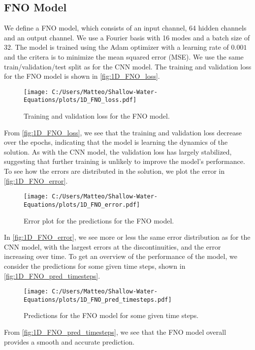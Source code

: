 \subsection*{FNO Model}
We define a FNO model, which consists of an input channel, 64 hidden channels and an output channel. We use a Fourier basis with 16 modes and a batch size of 32.
The model is trained using the Adam optimizer with a learning rate of $0.001$ and the critera is to minimize the mean squared error (MSE).
We use the same train/validation/test split as for the CNN model.
The training and validation loss for the FNO model is shown in \autoref{fig:1D_FNO_loss}.
\begin{figure}[H]
    \centering
    \texttt{[image: C:/Users/Matteo/Shallow-Water-Equations/plots/1D\_FNO\_loss.pdf]}
    \caption{Training and validation loss for the FNO model.}\label{fig:1D_FNO_loss}
\end{figure}
From \autoref{fig:1D_FNO_loss}, we see that the training and validation loss decrease over the epochs, indicating that the model is learning the dynamics of the solution.
As with the CNN model, the validation loss has largely stabilized, suggesting that further training is unlikely to improve the model's performance.
To see how the errors are distributed in the solution, we plot the error in \autoref{fig:1D_FNO_error}.
\begin{figure}[H]
    \centering
    \texttt{[image: C:/Users/Matteo/Shallow-Water-Equations/plots/1D\_FNO\_error.pdf]}
    \caption{Error plot for the predictions for the FNO model.}\label{fig:1D_FNO_error}
\end{figure}
In \autoref{fig:1D_FNO_error}, we see more or less the same error distribution as for the CNN model, with the largest errors at the discontinuities, and the error increasing over time.
To get an overview of the performance of the model, we consider the predictions for some given time steps, shown in \autoref{fig:1D_FNO_pred_timesteps}.
\begin{figure}[H]
    \centering
    \texttt{[image: C:/Users/Matteo/Shallow-Water-Equations/plots/1D\_FNO\_pred\_timesteps.pdf]}
    \caption{Predictions for the FNO model for some given time steps.}\label{fig:1D_FNO_pred_timesteps}
\end{figure}
From \autoref{fig:1D_FNO_pred_timesteps}, we see that the FNO model overall provides a smooth and accurate prediction.

